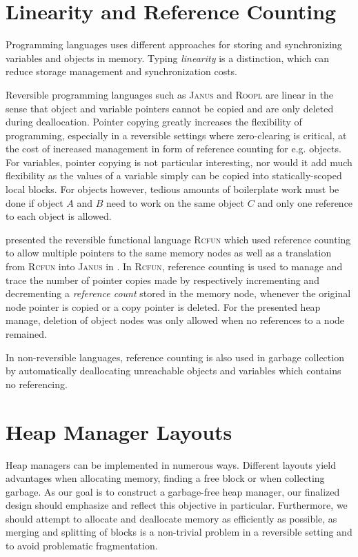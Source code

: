 \section{Linearity and Reference Counting}
\label{sec:referencing}
Programming languages uses different approaches for storing and synchronizing variables and objects in memory. Typing \textit{linearity} is a distinction, which can reduce storage management and synchronization costs. %

Reversible programming languages such as \textsc{Janus} and \textsc{Roopl} are linear in the sense that object and variable pointers cannot be copied and are only deleted during deallocation. Pointer copying greatly increases the flexibility of programming, especially in a reversible settings where zero-clearing is critical, at the cost of increased management in form of reference counting for e.g. objects. For variables, pointer copying is not particular interesting, nor would it add much flexibility as the values of a variable simply can be copied into statically-scoped local blocks. For objects however, tedious amounts of boilerplate work must be done if object $A$ and $B$ need to work on the same object $C$ and only one reference to each object is allowed.

\citeauthor{tm:refcounting} presented the reversible functional language \textsc{Rcfun} which used reference counting to allow multiple pointers to the same memory nodes as well as a translation from \textsc{Rcfun} into \textsc{Janus} in \cite{tm:refcounting}. In \textsc{Rcfun}, reference counting is used to manage and trace the number of pointer copies made by respectively incrementing and decrementing a \textit{reference count} stored in the memory node, whenever the original node pointer is copied or a copy pointer is deleted. For the presented heap manage, deletion of object nodes was only allowed when no references to a node remained.

In non-reversible languages, reference counting is also used in garbage collection by automatically deallocating unreachable objects and variables which contains no referencing. 


\section{Heap Manager Layouts}
\label{sec:heap-manager-layout}
Heap managers can be implemented in numerous ways. Different layouts yield advantages when allocating memory, finding a free block or when collecting garbage. As our goal is to construct a garbage-free heap manager, our finalized design should emphasize and reflect this objective in particular. Furthermore, we should attempt to allocate and deallocate memory as efficiently as possible, as merging and splitting of blocks is a non-trivial problem in a reversible setting and to avoid problematic fragmentation.

